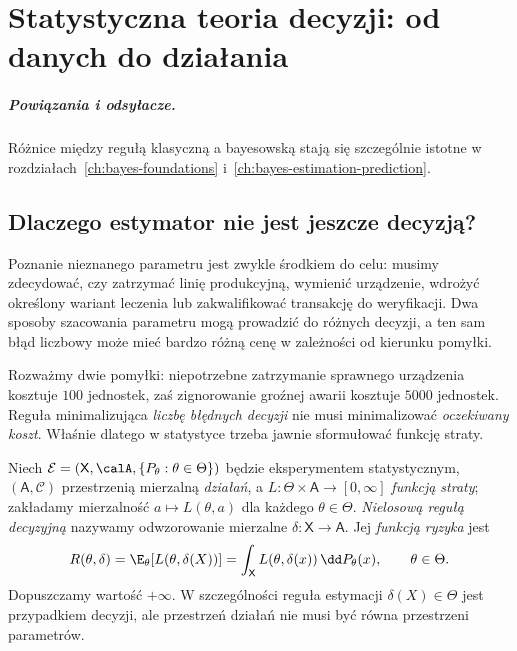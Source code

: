 \chapter{Statystyczna teoria decyzji: od danych do działania}
\label{ch:decision}
\paragraph{Powiązania i odsyłacze.} Różnice między regułą klasyczną a bayesowską stają się szczególnie istotne w rozdziałach~\ref{ch:bayes-foundations} i~\ref{ch:bayes-estimation-prediction}.


\section{Dlaczego estymator nie jest jeszcze decyzją?}
Poznanie nieznanego parametru jest zwykle środkiem do celu: musimy
zdecydować, czy zatrzymać linię produkcyjną, wymienić urządzenie,
wdrożyć określony wariant leczenia lub zakwalifikować transakcję do
weryfikacji. Dwa sposoby szacowania parametru mogą prowadzić do
różnych decyzji, a ten sam błąd liczbowy może mieć bardzo różną cenę
w zależności od kierunku pomyłki.

\begin{przyklad}
Rozważmy dwie pomyłki: niepotrzebne zatrzymanie sprawnego urządzenia
kosztuje $100$ jednostek, zaś zignorowanie groźnej awarii kosztuje
$5000$ jednostek. Reguła minimalizująca \emph{liczbę błędnych decyzji}
nie musi minimalizować \emph{oczekiwany koszt}. Właśnie dlatego
w statystyce trzeba jawnie sformułować funkcję straty.
\end{przyklad}

\begin{definicja}\label{def:decision-problem}
Niech $\mathcal E=(\mathsf X,\calA,\{P_\theta:\theta\in\Theta\})$ będzie
eksperymentem statystycznym, $(\mathsf A,\mathcal C)$ przestrzenią
mierzalną \emph{działań}, a $L:\Theta\times\mathsf A\to[0,\infty]$
\emph{funkcją straty}; zakładamy mierzalność $a\mapsto L(\theta,a)$
dla każdego $\theta\in\Theta$. \emph{Nielosową regułą decyzyjną}
nazywamy odwzorowanie mierzalne $\delta:\mathsf X\to\mathsf A$.
Jej \emph{funkcją ryzyka} jest
\[
R(\theta,\delta)
=\E_\theta[L(\theta,\delta(X))]
=\int_{\mathsf X}L(\theta,\delta(x))\,\dd P_\theta(x),
\qquad\theta\in\Theta.
\]
Dopuszczamy wartość $+\infty$. W szczególności reguła estymacji
$\delta(X)\in\Theta$ jest przypadkiem decyzji, ale przestrzeń działań
nie musi być równa przestrzeni parametrów.
\end{definicja}

